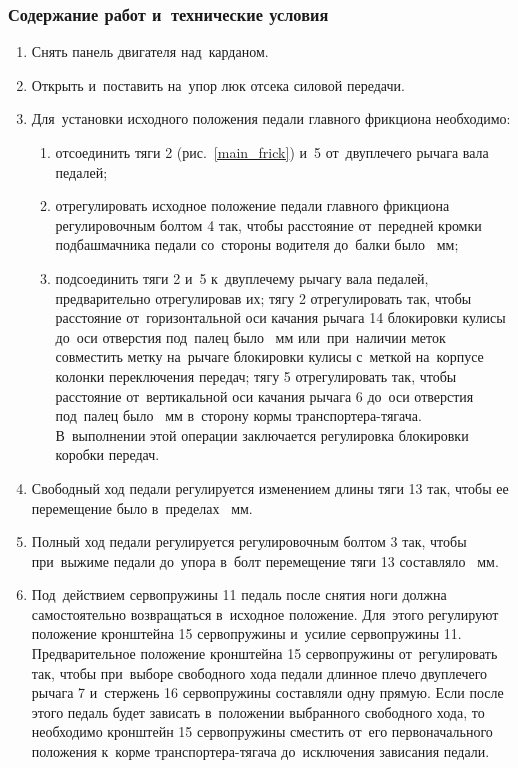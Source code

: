 \subsubsection{Содержание работ и~технические условия}
\begin{enumerate}
    \item Снять панель двигателя над~карданом. 
    \item Открыть и~поставить на~упор люк отсека силовой передачи. 
    \item Для~установки исходного положения педали главного фрикциона необходимо: 
    \begin{enumerate}
        \item отсоединить тяги 2 (рис.~\ref{main_frick}) и~5 от~двуплечего рычага вала педалей; 
        \item отрегулировать исходное положение педали главного фрикциона регулировочным болтом 4 так, чтобы расстояние от~передней кромки подбашмачника педали со~стороны водителя до~балки было ~мм; 
        \item подсоединить тяги 2 и~5 к~двуплечему рычагу вала педалей, предварительно отрегулировав их; тягу 2 отрегулировать так, чтобы расстояние от~горизонтальной оси качания рычага 14 блокировки кулисы до~оси отверстия под~палец было ~мм или~при~наличии меток совместить метку на~рычаге блокировки кулисы с~меткой на~корпусе колонки переключения передач; тягу 5 отрегулировать так, чтобы расстояние от~вертикальной оси качания рычага 6 до~оси отверстия под~палец было ~мм в~сторону кормы транспортера-тягача. В~выполнении этой операции заключается регулировка блокировки коробки передач. 
    \end{enumerate}
    \item Свободный ход педали регулируется изменением длины тяги 13 так, чтобы ее перемещение было в~пределах ~мм. 
    \item Полный ход педали регулируется регулировочным болтом 3 так, чтобы при~выжиме педали до~упора в~болт перемещение тяги 13 составляло ~мм. 
    \item Под~действием сервопружины 11 педаль после снятия ноги должна самостоятельно возвращаться в~исходное положение. Для~этого регулируют положение кронштейна 15 сервопружины и~усилие сервопружины 11. Предварительное положение кронштейна 15 сервопружины от~регулировать так, чтобы при~выборе свободного хода педали длинное плечо двуплечего рычага 7 и~стержень 16 сервопружины составляли одну прямую. 
    Если после этого педаль будет зависать в~положении выбранного свободного хода, то необходимо кронштейн 15 сервопружины сместить от~его первоначального положения к~корме транспортера-тягача до~исключения зависания педали. 

\end{enumerate}
